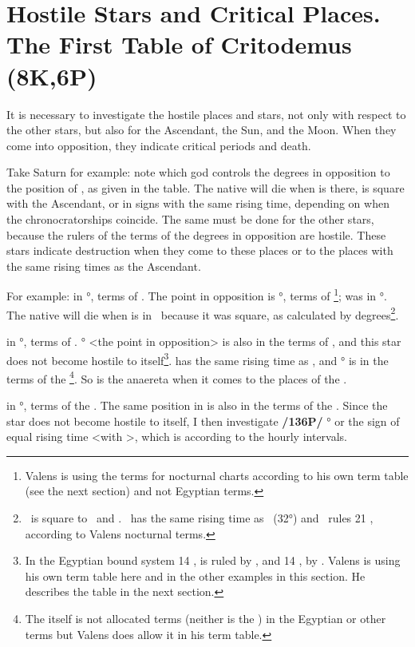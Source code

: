 \section{Hostile Stars and Critical Places. The First Table of Critodemus (8K,6P)}

It is necessary to investigate the hostile places and stars, not only with respect to the other stars, but also for the Ascendant, the Sun, and the Moon. When they come into opposition, they indicate critical periods and death. 

Take Saturn for example: note which god controls the degrees in opposition to the position of \Saturn, as given in the table. The native will die when \Saturn\xspace is there, is square with the Ascendant, or in signs with the same rising time, depending on when the chronocratorships coincide. The
same must be done for the other stars, because the rulers of the terms of the degrees in opposition are hostile. These stars indicate destruction when they come to these places or to the places with the same rising times as the Ascendant.

For example: \Saturn\xspace in \Cancer\xspace 21°, terms of \Venus. The point in opposition is \Capricorn\xspace 21°, terms
of \Mars\footnote{Valens is using the terms for nocturnal charts according to  his own term table (see the next section)  and not Egyptian terms.}; \Mars\xspace was in \Taurus\xspace 27°. The native will die when \Saturn\xspace is in \Virgo\, because it was square, as calculated by degrees\footnote{\Virgo\, is square to \Gemini\, and \Sagittarius. \Sagittarius\, has the same rising time as \Cancer\, (32°) and \Mars\, rules 21 \Virgo, according to Valens nocturnal terms.}.

\Jupiter\xspace in \Scorpio\xspace 14°, terms of \Saturn. \Taurus\xspace 14° <the point in opposition> is also in the terms of \Saturn, and this star does not become hostile to itself\footnote{In the Egyptian bound system 14 \Scorpio, is ruled by \Mercury, and 14 \Taurus, by \Jupiter. Valens is using his own term table here and in the other examples in this section. He describes the table in the next section.}. \Leo\xspace has the same rising time as \Scorpio, and \Leo\xspace 14° is in the terms of the \Sun\footnote{The \Sun\xspace itself is not allocated terms (neither is the \Moon) in the Egyptian or other terms but Valens does allow it in his term table.}. So \Jupiter\xspace is the anaereta when it comes to the places of the \Sun.

\Mars\xspace in \Taurus\xspace 27°, terms of the \Sun. The same position in \Scorpio\xspace <the point in opposition> is also in the terms of the \Sun. Since the star does not become hostile to itself, I then investigate \textbf{/136P/} \Leo\xspace 27° or the sign of equal rising time <with \Taurus>, which is \Gemini\xspace according to the hourly intervals.

